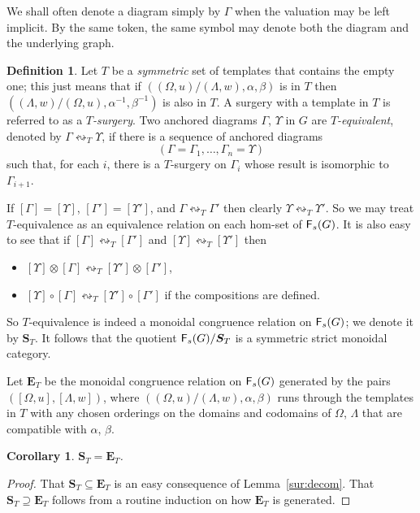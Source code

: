 \documentclass[12pt]{amsart}
\theoremstyle{plain}
\newtheorem{cor}[thm]{Corollary}
\theoremstyle{definition}
\newtheorem{defn}[thm]{Definition}
\theoremstyle{remark}
\numberwithin{equation}{section}
\theoremstyle{plain}
\newcommand{\0}{\emptyset}
\newcommand{\sub}{\subseteq}
\newcommand{\cat}[1]{\textup{\textsf{#1}}}
\newcommand{\memph}[1]{{\color{magenta}\emph{#1}}}
\begin{document}
We shall often denote a diagram simply by $\Gamma$ when the valuation may be left implicit. By the same token, the same symbol may denote both the diagram and the underlying graph.

\begin{defn}
Let $T$ be a \memph{symmetric} set of  templates that contains the empty one; this just means that if $((\Omega, u) / (\Lambda, w), \alpha, \beta)$ is  in $T$ then $( (\Lambda, w) / (\Omega, u), \alpha^{-1}, \beta^{-1})$ is also   in $T$. A surgery  with a template in $T$ is referred to as a \memph{$T$-surgery}. Two anchored  diagrams $\Gamma$, $\Upsilon$ in $G$ are \memph{$T$-equivalent}, denoted by $\Gamma \leftrightsquigarrow_T \Upsilon$, if there is a sequence of anchored  diagrams
\[
(\Gamma = \Gamma_1, \ldots, \Gamma_n = \Upsilon)
\]
such that, for each $i$, there is a $T$-surgery on $\Gamma_i$ whose result is isomorphic to $\Gamma_{i+1}$.
\end{defn}

If $[\Gamma] = [\Upsilon]$, $[\Gamma'] = [\Upsilon']$, and $\Gamma \leftrightsquigarrow_T \Gamma'$ then clearly $\Upsilon \leftrightsquigarrow_T \Upsilon'$. So we may treat $T$-equivalence as an equivalence relation on each hom-set of $\cat F_s(G)$. It is also easy to see that if $[\Gamma] \leftrightsquigarrow_T [\Gamma']$ and $[\Upsilon] \leftrightsquigarrow_T [\Upsilon']$ then
\begin{itemize}
  \item $[\Upsilon] \otimes [\Gamma] \leftrightsquigarrow_T [\Upsilon'] \otimes [\Gamma']$,
  \item $[\Upsilon] \circ [\Gamma] \leftrightsquigarrow_T [\Upsilon'] \circ [\Gamma']$ if the compositions are defined.
\end{itemize}
So $T$-equivalence is indeed a monoidal congruence relation on $\cat F_s(G)$; we denote it by $\bm S_T$. It follows that the quotient $\cat F_s(G) / \bm S_T$ is a symmetric strict monoidal category.


Let $\bm  E_{T}$ be the monoidal congruence relation on $\cat F_s(G)$ generated by the pairs $([\Omega, u], [\Lambda, w])$, where $((\Omega, u) / (\Lambda, w), \alpha, \beta)$ runs through the templates in $T$ with any chosen orderings on the domains and codomains of $\Omega$, $\Lambda$ that are compatible with $\alpha$, $\beta$.

\begin{cor}\label{graph:small}
$\bm S_T = \bm  E_{T}$.
\end{cor}
\begin{proof}
That $\bm S_T \sub \bm  E_{T}$ is an easy consequence of Lemma~\ref{sur:decom}. That $\bm S_T \supseteq \bm  E_{T}$ follows from a routine induction on how $\bm  E_{T}$ is generated.
\end{proof}
\end{document}
